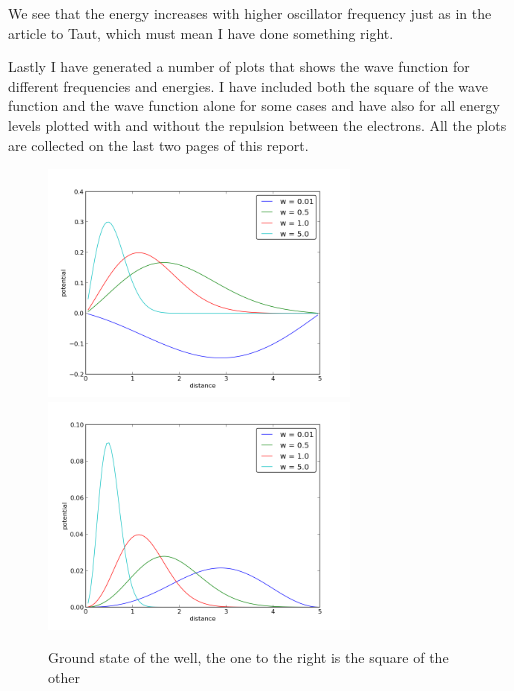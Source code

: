 \documentclass[a4wide,12pt]{article}
\begin{document}
We see that the energy increases with higher oscillator frequency just as in the article to Taut, which must mean I have done something right. 

Lastly I have generated a number of plots that shows the wave function for different frequencies and energies. I have included both the square of the wave function and the wave function alone for some cases and 
have also for all energy levels plotted with and without the repulsion between the electrons. All the plots are collected on the last two pages of this report.
\begin{figure}[p]
	\includegraphics[width=80mm]{electronpotential}
	\includegraphics[width=80mm]{electronpotentialsquare}
		\caption{Ground state of the well, the one to the right is the square of the other}
\end{figure}
\end{document}
